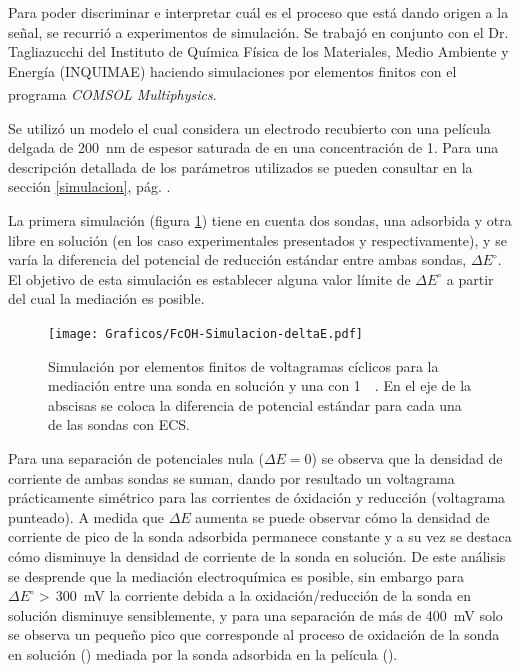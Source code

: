 		Para poder discriminar e interpretar cuál es el proceso que está dando origen a la señal, se recurrió a experimentos de simulación. Se trabajó en conjunto con el Dr. Tagliazucchi del Instituto de Química Física de los Materiales, Medio Ambiente y Energía (INQUIMAE) haciendo simulaciones por elementos finitos con el programa \textit{COMSOL Multiphysics\textsuperscript\textregistered}.

		Se utilizó un modelo el cual considera un electrodo recubierto con una película delgada de \SI{200}{nm} de espesor saturada de  \aminorutenio en una concentración de \SI{1}{\Molar}. Para una descripción detallada de los parámetros utilizados se pueden consultar en la sección \ref{simulacion}, pág. \pageref{simulacion}. 

		La primera simulación (figura \ref{fig:sim_mediacion}) tiene en cuenta dos sondas, una adsorbida y otra libre en solución (en los caso experimentales presentados \ru\space y \fc\space respectivamente), y se varía la diferencia del potencial de reducción estándar entre ambas sondas, $\Delta E^\circ$. El objetivo de esta simulación es establecer alguna valor límite de $\Delta E^\circ$ a partir del cual la mediación es posible. 

			\begin{figure}[th!]
					\centering
					\vspace*{-2mm}
			 	    \texttt{[image: Graficos/FcOH-Simulacion-deltaE.pdf]}
			 	    \vspace*{-3mm}
			        \caption[Simulación EQ de mediación rédox]{Simulación por elementos finitos de voltagramas cíclicos para la mediación entre una sonda en solución y una \pdmF\space con \ru\space \SI{1}{\milli\Molar}. En el eje de la abscisas se coloca la diferencia de potencial estándar para cada una de las sondas con ECS.}
			        \label{fig:sim_mediacion}\vspace*{3mm}
			      	\end{figure}

		Para una separación de potenciales nula ($\Delta E=0$) se observa que la densidad de corriente de ambas sondas se suman, dando por resultado un voltagrama prácticamente simétrico para las corrientes de óxidación y reducción (voltagrama punteado). A medida que $\Delta E$ aumenta se puede observar cómo la densidad de corriente de pico de la sonda adsorbida permanece constante y a su vez se destaca cómo disminuye la densidad de corriente de la sonda en solución. De este análisis se desprende que la mediación electroquímica es posible, sin embargo para $\Delta E^\circ\!\!>\,$\SI{300}{\milli\volt} la corriente debida a la oxidación/reducción de la sonda en solución disminuye sensiblemente, y para una separación de más de \SI{400}{\milli\volt} solo se observa un pequeño pico que corresponde al proceso de oxidación de la sonda en solución (\fc) mediada por la sonda adsorbida en la película (\ru).

